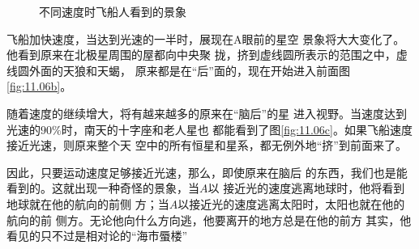 \begin{figure}[h]
    \centering
    \caption{不同速度时飞船人看到的景象}
    \label{fig:11.06}
\end{figure}

飞船加快速度，当达到光速的一半时，展现在A眼前的星空
景象将大大变化了。他看到原来在北极星周围的屋都向中央聚
拢，挤到虚线圆所表示的范围之中，虚线圆外面的天狼和天蝎，
原来都是在“后”面的，现在开始进入前面\lhbrak 图\ref{fig:11.06b}\rhbrak 。

随着速度的继续增大，将有越来越多的原来在“脑后”的星
进入视野。当速度达到光速的$ 90\% $时，南天的十字座和老人星也
都能看到了\lhbrak 图\ref{fig:11.06c}\rhbrak 。如果飞船速度接近光速，则原来整个天
空中的所有恒星和星系，都无例外地“挤”到前面来了。

因此，只要运动速度足够接近光速，那么，即使原来在脑后
的东西，我们也是能看到的。这就出现一种奇怪的景象，当$ A $以
接近光的速度逃离地球时，他将看到地球就在他的航向的前侧
方；当$ A $以接近光的速度逃离太阳时，太阳也就在他的航向的前
侧方。无论他向什么方向逃，他要离开的地方总是在他的前方
其实，他看见的只不过是相对论的“海市蜃楼”
